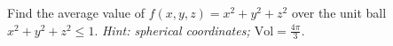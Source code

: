 \documentclass[11pt]{article}
\begin{document}
\begin{practice}

\vspace{4cm}

\prob Find the average value of $f(x,y,z) = x^2+y^2+z^2$ over the unit ball $x^2+y^2+z^2 \le 1$. \textit{Hint: spherical coordinates; $\text{Vol}=\tfrac{4\pi}{3}$.}


\vspace{4cm}

\end{practice}
\end{document}
